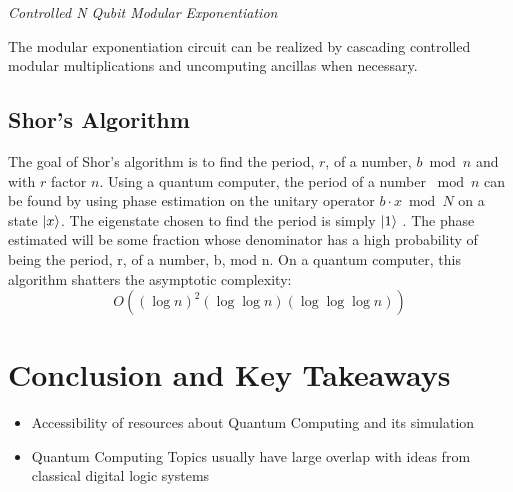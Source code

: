 \documentclass[journal]{IEEEtran}
\begin{document}
\emph{Controlled N Qubit Modular Exponentiation}

The modular exponentiation circuit can be realized by cascading controlled
modular multiplications and uncomputing ancillas when necessary.

\subsection{Shor's Algorithm}
The goal of Shor's algorithm is to find the period, \(r\), of a number, \(b \bmod n \) and with \(r\) factor \(n\).
Using a quantum computer, the period of a number \(\bmod n\) can be found by using
phase estimation on the unitary operator \(b\cdot x \bmod N\) on a state \(\ket{x}\). The eigenstate
chosen to find the period is simply \(\ket{1}\) . The phase estimated will be some
fraction whose denominator has a high probability of being the period, r, of a
number, b, mod n.
On a quantum computer, this algorithm shatters the asymptotic complexity:
\[
    O\left((\log n)^{2}(\log\log n)(\log\log\log n)\right)
\]

\section{Conclusion and Key Takeaways}
\begin{itemize}
    \item Accessibility of resources about Quantum Computing and its simulation
    \item Quantum Computing Topics usually have large overlap with ideas from classical digital logic systems
\end{itemize}

% 
% 
\printbibliography

\end{document}

